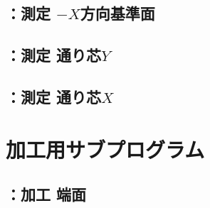\clearpage
\subsection{\MXface：測定 \texorpdfstring{$-X$}{-X}方向基準面}



\clearpage
\subsection{\MYcenterline：測定 通り芯\texorpdfstring{$Y$}{Y}}



\clearpage
\subsection{\MXcenterline：測定 通り芯\texorpdfstring{$X$}{X}}




\clearpage
\section{加工用サブプログラム}


\subsection{\KRecRight：加工 端面}



\clearpage

